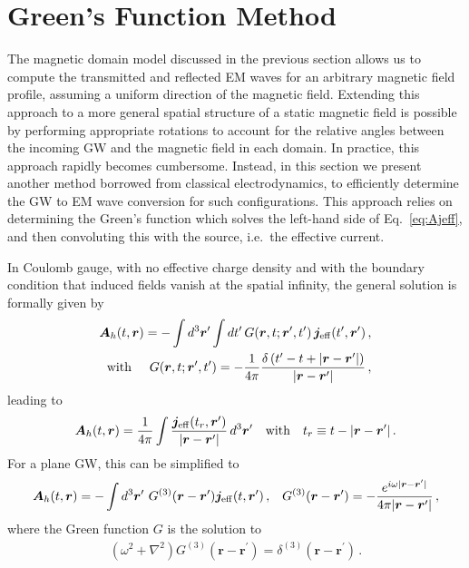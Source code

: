 \documentclass[a4paper,11pt]{article}
\begin{document}
\section{Green's Function Method}
\label{sec:Green's_Function_Method}


The magnetic domain model discussed in the previous section allows us to compute the transmitted and reflected EM waves for an arbitrary magnetic field profile, assuming a uniform direction of the magnetic field.
%
Extending this approach to a more general spatial structure of a static magnetic field is possible by performing appropriate rotations to account for the relative angles between the incoming GW and the magnetic field in each domain.
%
In practice, this approach rapidly becomes cumbersome. 
%
Instead, in this section we present another method borrowed from classical electrodynamics, to efficiently determine the GW to EM wave conversion for such configurations.
%
This approach relies on determining the Green's function which solves the left-hand side of Eq.~\eqref{eq:Ajeff}, and then convoluting this with the source, i.e.\ the effective current.


In Coulomb gauge,
with no effective charge density and with the boundary condition that induced fields vanish at the spatial infinity, the general solution is formally given by
%
\begin{equation}
    \begin{aligned}
    \bm{A}_h(t,\bm{r}) = - \int d^3\bm{r}' \int dt' \, G(\bm{r}, t; \bm{r}', t') \, \bm{j}_{\rm eff}( t',\bm{r}')\,,
    \\   \text{with} \hspace{0.5cm}  G(\bm{r}, t; \bm{r}', t') = - \frac{1}{4\pi}\frac{\delta\left(t' - t + |\bm{r} - \bm{r}'| \right)}{|\bm{r} - \bm{r}'|}\,,
    \end{aligned}
\end{equation}
%
leading to
%
\begin{equation}
\bm{A}_h( t, \bm{r}) =  \frac{1}{4\pi}\int \frac{\bm{j}_{\rm eff}( t_r, \bm{r}')}{|\bm{r} - \bm{r}'|} \, d^3\bm{r}' \quad \text{with} \quad t_r \equiv t - |\bm{r} - \bm{r}'| \,.
\end{equation}
%
For a plane GW, this can be simplified to
%
\begin{align}
 \bm{A}_{h} (t, \bm{r} ) = -\int d^{3}\bm{r}^{\prime} ~  G^{(3)}(\bm r - \bm r^{\prime}) \bm{j}_{\rm eff} ( t, \bm r^{\prime}) \,, &&
    G^{(3)} (\bm {r} - \bm{r}^{\prime}) = -  \frac{e^{i \omega \vert \bm{r} - \bm{r}^{\prime} \vert }}{ 4\pi \vert {\bm r} - {\bm r}^{\prime} \vert} \,,
    \label{eq:sol_green}
\end{align}
%
where the Green function $ G $ is the solution to
\begin{align}
    (\omega^{2} + \nabla^{2}) G^{(3)} (\bm {r} - \bm{r}^{\prime}) = \delta^{(3)} (\bm {r} - \bm{r}^{\prime})\,.
\end{align}
%
\end{document}
